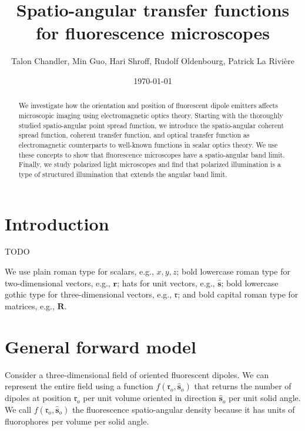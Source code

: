\documentclass[11pt]{article}
\providecommand{\mb}[1]{\mathbf{#1}}
\providecommand{\ro}[1]{\mathbf{\mathfrak{r}}_o}
\providecommand{\so}[1]{\mathbf{\hat{s}}_o}
\begin{document}
\title{\vspace{-2.5em} Spatio-angular transfer functions for fluorescence microscopes\vspace{-1em}}  \author{Talon Chandler, Min Guo, Hari Shroff, Rudolf Oldenbourg, Patrick La Rivi\`ere}
\date{\vspace{-1em}\today\vspace{-1em}}
\maketitle
\begin{abstract}
  We investigate how the orientation and position of fluorescent dipole emitters
  affects microscopic imaging using electromagnetic optics theory. Starting with
  the thoroughly studied spatio-angular point spread function, we introduce the
  spatio-angular coherent spread function, coherent transfer function, and
  optical transfer function as electromagnetic counterparts to well-known
  functions in scalar optics theory. We use these concepts to show that
  fluorescence microscopes have a spatio-angular band limit. Finally, we study
  polarized light microscopes and find that polarized illumination is a type of
  structured illumination that extends the angular band limit.
\end{abstract}
\section{Introduction}
TODO

We use plain roman type for scalars, e.g., $x, y, z$; bold lowercase roman type
for two-dimensional vectors, e.g., $\mb{r}$; hats for unit vectors, e.g.,
$\mb{\hat{s}}$; bold lowercase gothic type for three-dimensional vectors, e.g.,
$\mb{\mathfrak{r}}$; and bold capital roman type for matrices, e.g., $\mb{R}$.

\section{General forward model}
Consider a three-dimensional field of oriented fluorescent dipoles. We can
represent the entire field using a function $f(\ro{}, \so{})$ that returns the
number of dipoles at position $\ro{}$ per unit volume oriented in direction
$\so{}$ per unit solid angle. We call $f(\ro{}, \so{})$ the fluorescence
spatio-angular density because it has units of fluorophores per volume per solid
angle.
\end{document}
